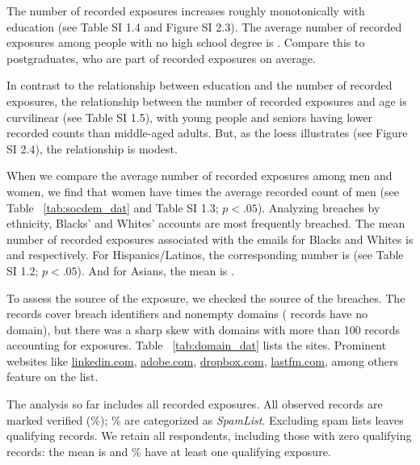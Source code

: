 \documentclass[sigconf]{acmart}
\begin{document}
The number of recorded exposures increases roughly monotonically with education (see Table SI 1.4 and Figure SI 2.3). The average number of recorded exposures among people with no high school degree is \noHighSchoolMean{}. Compare this to postgraduates, who are part of \postgraduateMean{} recorded exposures on average.

In contrast to the relationship between education and the number of recorded exposures, the relationship between the number of recorded exposures and age is curvilinear (see Table SI 1.5), with young people and seniors having lower recorded counts than middle-aged adults. But, as the loess illustrates (see Figure SI 2.4), the relationship is modest.



When we compare the average number of recorded exposures among men and women, we find that women have \femaleMaleRatio{} times the average recorded count of men (see Table ~\ref{tab:socdem_dat} and Table SI 1.3; $p < .05$). Analyzing breaches by ethnicity, Blacks' and Whites' accounts are most frequently breached. The mean number of recorded exposures associated with the emails for Blacks and Whites is \blackMean{} and \whiteMean{} respectively. For Hispanics/Latinos, the corresponding number is \hispanicMean{} (see Table SI 1.2; $p < .05$). And for Asians, the mean is \asianMean{}.

To assess the source of the exposure, we checked the source of the breaches. The records cover \breachCount{} breach identifiers and \domainCount{} nonempty domains (\missingDomainCount{} records have no domain), but there was a sharp skew with \topDomainCount{} domains with more than 100 records accounting for \topDomainEvents{} exposures. Table ~\ref{tab:domain_dat} lists the \topDomainCount{} sites. Prominent websites like \url{linkedin.com}, \url{adobe.com}, \url{dropbox.com}, \url{lastfm.com}, among others feature on the list.



The analysis so far includes all recorded exposures. All observed records are marked verified (\verifiedPercent{}\%); \spamPercent{}\% are categorized as {\it SpamList}. Excluding spam lists leaves \nonspamCount{} qualifying records. We retain all \sampleSize{} respondents, including those with zero qualifying records: the mean is \nonspamMean{} and \nonspamPercent{}\% have at least one qualifying exposure.


\end{document}
